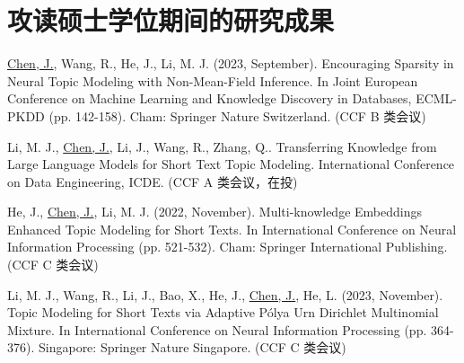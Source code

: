 \chapter{攻读硕士学位期间的研究成果}


\begin{enumerate}[label = {[\arabic*]}]
    \item \underline{Chen, J.}, Wang, R., He, J., Li, M. J. (2023, September). Encouraging Sparsity in Neural Topic Modeling with Non-Mean-Field Inference. In Joint European Conference on Machine Learning and Knowledge Discovery in Databases, ECML-PKDD (pp. 142-158). Cham: Springer Nature Switzerland. (CCF B 类会议)
    \item Li, M. J., \underline{Chen, J.}, Li, J., Wang, R., Zhang, Q.. Transferring Knowledge from Large Language Models for Short Text Topic Modeling. International Conference on Data Engineering, ICDE. (CCF A 类会议，在投)
    \item He, J., \underline{Chen, J.}, Li, M. J. (2022, November). Multi-knowledge Embeddings Enhanced Topic Modeling for Short Texts. In International Conference on Neural Information Processing (pp. 521-532). Cham: Springer International Publishing. (CCF C 类会议)
    \item Li, M. J., Wang, R., Li, J., Bao, X., He, J., \underline{Chen, J.}, He, L. (2023, November). Topic Modeling for Short Texts via Adaptive P{\'{o}}lya Urn Dirichlet Multinomial Mixture. In International Conference on Neural Information Processing (pp. 364-376). Singapore: Springer Nature Singapore. (CCF C 类会议)
\end{enumerate}

